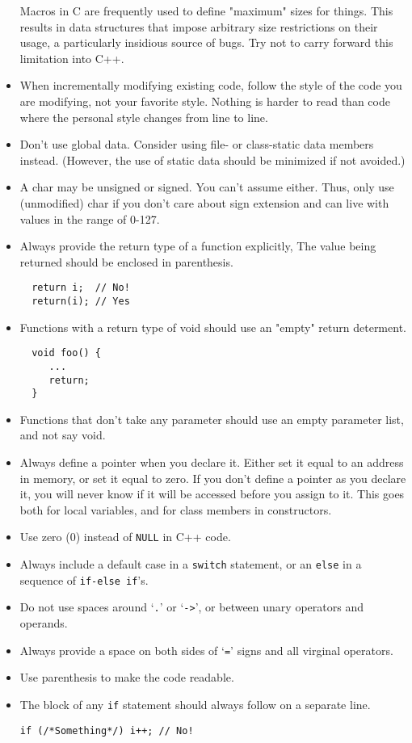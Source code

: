 \documentclass[10pt,letter,relax]{SANDreport}
\begin{document}
\begin{itemize}
  Macros in C are frequently used to define "maximum" sizes for things.
  This results in data structures that impose arbitrary size
  restrictions on their usage, a particularly insidious source of bugs.
  Try not to carry forward this limitation into C++.
\item When incrementally modifying existing code, follow the style of the code you are modifying, not your favorite style. Nothing is harder to read than code where the personal style changes from line to line.
\item Don't use global data. Consider using file- or class-static data members
instead. (However, the use of static data should be minimized if not avoided.)
\item A char may be unsigned or signed. You can't assume either. Thus,
  only use (unmodified) char if you don't care about sign extension and
  can live with values in the range of 0-127.
\item Always provide the return type of a function explicitly, The value
  being returned should be enclosed in parenthesis.
  \begin{verbatim}
  return i;  // No!
  return(i); // Yes
  \end{verbatim}
\item Functions with a return type of void should use an "empty" return
  determent.
  \begin{verbatim}
  void foo() {
     ...
     return;
  }
  \end{verbatim}
\item Functions that don't take any parameter should use an empty parameter
list, and not say void.
\item Always define a pointer when you  declare it. Either set it equal to
an address in memory, or set it equal to zero. If you don't define a pointer
as you declare it, you will never know if it will be accessed before you
assign to it. This goes both for local variables, and for class members in
constructors.
\item Use zero (0) instead of \verb!NULL! in C++ code.
\item Always include a default case in a \verb!switch! statement, or an \verb!else! in a sequence of \verb!if-else if!'s.
\item Do not use spaces around `\verb!.!' or `\verb!->!', or between unary operators and
operands.
\item Always provide a space on both sides of `\verb!=!' signs and all
virginal
operators.
\item Use parenthesis to make the code readable.
\item The block of any \verb!if! statement should always follow on a separate
line.
\begin{verbatim}
if (/*Something*/) i++; // No!


\end{verbatim}
\end{itemize}
\end{document}
